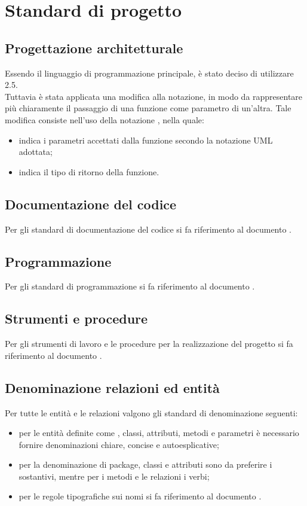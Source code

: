 \section{Standard di progetto}
\subsection{Progettazione architetturale}
Essendo  il linguaggio di programmazione principale, è stato 
deciso di utilizzare  2.5. \\
Tuttavia è stata applicata una modifica alla notazione, in modo da rappresentare più chiaramente il passaggio di una funzione come parametro di un'altra.
Tale modifica consiste nell’uso della notazione , nella quale:
\begin{itemize}
	\item {} indica i parametri accettati dalla funzione secondo la notazione UML adottata;
	\item {} indica il tipo di ritorno della funzione.
\end{itemize}
\subsection{Documentazione del codice}
Per gli standard di documentazione del codice si fa riferimento al documento \NPdoc.
\subsection{Programmazione}
Per gli standard di programmazione si fa riferimento al documento \NPdoc.
\subsection{Strumenti e procedure}
Per gli strumenti di lavoro e le procedure per la realizzazione del progetto si fa riferimento al documento \NPdoc.
\subsection{Denominazione relazioni ed entità}
Per tutte le entità e le relazioni valgono gli standard di denominazione seguenti:
\begin{itemize}
	\item per le entità definite come , classi, attributi, metodi e parametri è necessario fornire denominazioni chiare, concise e autoesplicative;
	\item per la denominazione di package, classi e attributi sono da preferire i sostantivi, mentre per i metodi e le relazioni i verbi;
	\item per le regole tipografiche sui nomi si fa riferimento al documento \NPdoc.
\end{itemize}